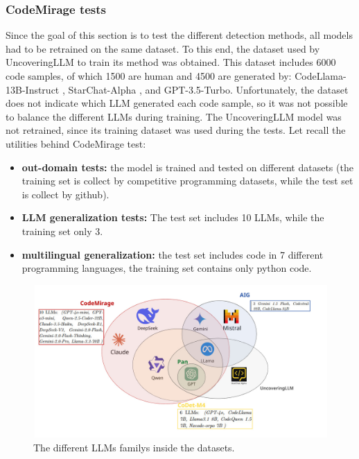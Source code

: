 \subsubsection{CodeMirage tests}
Since the goal of this section is to test the different detection methods, 
all models had to be retrained on the same dataset. To this end, the dataset 
used by UncoveringLLM \cite{oedingen2024chatgpt} to train its method was obtained. 
This dataset includes 
6000 code samples, of which 1500 are human and 4500 are generated by: 
CodeLlama-13B-Instruct \cite{roziere2023code}, 
StarChat-Alpha \cite{Tunstall2023starchat-alpha}, 
and GPT-3.5-Turbo. 
Unfortunately, 
the dataset does not indicate which LLM generated each code sample, so it 
was not possible to balance the different LLMs during training. The 
UncoveringLLM model was not retrained, since its training dataset was used 
during the tests.
Let recall the utilities behind CodeMirage \cite{guo2025codemirage} test:
\begin{itemize}
\item \textbf{out-domain tests:} the model is trained and tested on different datasets 
(the training set is collect by competitive programming datasets, while the test set 
is collect by github).
\item \textbf{LLM generalization tests:} The test set includes 10 LLMs, while the training set only 3.
\item \textbf{multilingual generalization:} the test set includes code in 7 different programming languages, 
the training set contains only python code.
\end{itemize}


\begin{figure}[H]
    \centering
    \includegraphics[width=1\textwidth]{img/1/Untitled - LLM over dataset.jpg}
    \caption{The different LLMs familys inside the datasets.}
    \label{fig:LLMOverDataset}
\end{figure}

